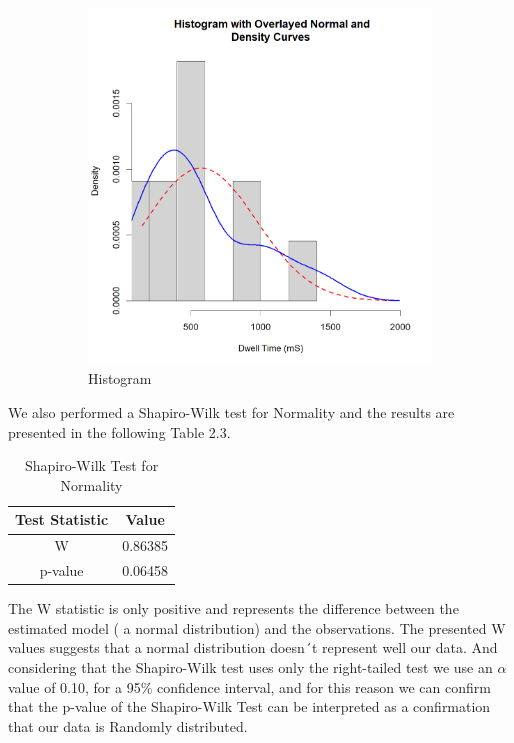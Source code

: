 \documentclass[a4paper,english,12pt,bibliography=totoc]{scrreprt}
\begin{document}
\begin{figure}[htbp]
\begin{subfigure}[b]{0.49\textwidth}
        \includegraphics[width=\textwidth]{histogram.png}
        \caption{Histogram}
        \label{fig:figure2}
    \end{subfigure}
    \caption{}
    \label{fig:both_figures}
\end{figure}

We also performed a Shapiro-Wilk test \cite{shapiro_analysis_1965} for Normality  and the results are presented in the following Table 2.3.

\begin{table}[H]
\centering
\caption{Shapiro-Wilk Test for Normality}
\begin{tabular}{|c|c|}
\hline
Test Statistic & Value \\
\hline
W & 0.86385 \\
p-value & 0.06458 \\
\hline
\end{tabular}
\end{table}

The W statistic is only positive and represents the difference between the estimated model ( a normal distribution) and the observations. The presented W values suggests that a normal distribution doesn´t represent well our data.
And considering that the Shapiro-Wilk test uses only the right-tailed test we use an $\alpha$ value of 0.10, for a 95\% confidence interval, and for this reason we can confirm that the p-value of the Shapiro-Wilk Test can be interpreted as a confirmation that our data is Randomly distributed.\\
\end{document}
